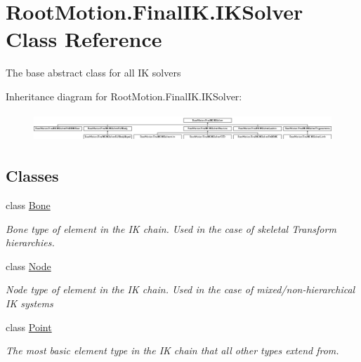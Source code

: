 \hypertarget{class_root_motion_1_1_final_i_k_1_1_i_k_solver}{}\section{Root\+Motion.\+Final\+I\+K.\+I\+K\+Solver Class Reference}
\label{class_root_motion_1_1_final_i_k_1_1_i_k_solver}


The base abstract class for all IK solvers  


Inheritance diagram for Root\+Motion.\+Final\+I\+K.\+I\+K\+Solver\+:\begin{figure}[H]
\begin{center}
\leavevmode
\includegraphics[height=1.076923cm]{class_root_motion_1_1_final_i_k_1_1_i_k_solver}
\end{center}
\end{figure}
\subsection*{Classes}
\begin{DoxyCompactItemize}
\item 
class \mbox{\hyperlink{class_root_motion_1_1_final_i_k_1_1_i_k_solver_1_1_bone}{Bone}}
\begin{DoxyCompactList}\small\item\em Bone type of element in the IK chain. Used in the case of skeletal Transform hierarchies. \end{DoxyCompactList}\item 
class \mbox{\hyperlink{class_root_motion_1_1_final_i_k_1_1_i_k_solver_1_1_node}{Node}}
\begin{DoxyCompactList}\small\item\em Node type of element in the IK chain. Used in the case of mixed/non-\/hierarchical IK systems \end{DoxyCompactList}\item 
class \mbox{\hyperlink{class_root_motion_1_1_final_i_k_1_1_i_k_solver_1_1_point}{Point}}
\begin{DoxyCompactList}\small\item\em The most basic element type in the IK chain that all other types extend from. \end{DoxyCompactList}\end{DoxyCompactItemize}
